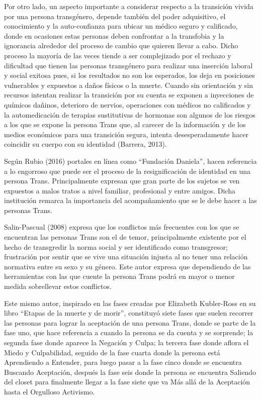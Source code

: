 Por otro lado, un aspecto importante a considerar respecto a la transición
vivida por una persona transgénero, depende también del poder adquisitivo, el
conocimiento y la auto-confianza para ubicar un médico seguro y calificado,
donde en ocasiones estas personas deben confrontar a la transfobia y la
ignorancia alrededor del proceso de cambio que quieren llevar a cabo.
Dicho proceso la mayoría de las veces tiende a ser complejizado por el rechazo y
dificultad que tienen las personas transgénero para realizar una inserción laboral y
social exitosa pues, si los resultados no son los esperados, los deja en
posiciones vulnerables y expuestos a daños físicos o la muerte.
Cuando sin orientación y sin recursos intentan realizar la transición por su
cuenta se exponen a inyecciones de químicos dañinos,
deterioro de nervios, operaciones con médicos no calificados y la
automedicación de terapias sustitutivas de hormonas son algunos de los
riesgos a los que se expone la persona Trans que, al carecer de la
información y de los medios económicos para una transición segura,
intenta desesperadamente hacer coincidir su cuerpo con su identidad (Barrera,
2013).

Según Rubio (2016) portales en línea como “Fundación Daniela”, hacen referencia
a lo engorroso que puede ser el proceso de la resignificación de identidad en
una persona Trans.
Principalmente expresan que gran parte de los sujetos se ven expuestos a malos
tratos a nivel familiar, profesional y entre amigos.
Dicha institución remarca la importancia del acompañamiento que se le debe hacer
a las personas Trans.

Salin-Pascual (2008) expresa que los conflictos más frecuentes con los que se
encuentran las personas Trans son el de temor, principalmente existente por el
hecho de transgredir la norma social y ser identificado como transgresor;
frustración por sentir que se vive una situación injusta al no tener una
relación normativa entre su sexo y su género.
Este autor expresa que dependiendo de las herramientas con las que cuente la
persona Trans podrá en mayor o menor medida sobrellevar estos conflictos.

Este mismo autor, inspirado en las fases creadas por Elizabeth Kubler-Ross en su
libro “Etapas de la muerte y de morir”, constituyó siete fases que suelen
recorrer las personas para lograr la aceptación de una persona Trans, donde se
parte de la fase uno, que hace referencia a cuando la persona se da cuenta y se
sorprende;
la segunda fase donde aparece la Negación y Culpa;
la tercera fase donde aflora el Miedo y Culpabilidad, seguido de la fase
cuarta donde la persona está Aprendiendo a Entender, para luego pasar a la
fase cinco donde se encuentra Buscando Aceptación, después la fase seis donde la
persona se encuentra Saliendo del closet para finalmente llegar a la fase
siete que va Más allá de la Aceptación hasta el Orgulloso Activismo.
